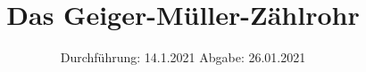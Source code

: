 

\subject{Versuch Nr.V703}
\title{Das Geiger-Müller-Zählrohr}
\date{%
  Durchführung: 14.1.2021
  \hspace{3em}
  Abgabe: 26.01.2021
}



\maketitle
\thispagestyle{empty}
\tableofcontents
\newpage 








\nocite{*}

\printbibliography{}


